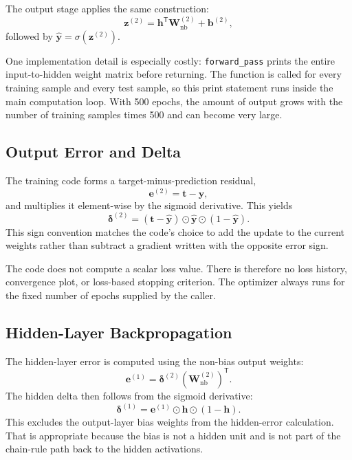 \documentclass[11pt,a4paper]{article}
\newcommand{\code}[1]{\texttt{\small #1}}
\begin{document}
The output stage applies the same construction:
\begin{equation}
\mathbf{z}^{(2)} = \mathbf{h}^{\mathsf T}\mathbf{W}^{(2)}_{\mathrm{nb}} + \mathbf{b}^{(2)},
\end{equation}
followed by \(\hat{\mathbf{y}}=\sigma(\mathbf{z}^{(2)})\).

One implementation detail is especially costly: \code{forward\_pass} prints the entire input-to-hidden weight matrix before returning. The function is called for every training sample and every test sample, so this print statement runs inside the main computation loop. With 500 epochs, the amount of output grows with the number of training samples times 500 and can become very large.

\subsection{Output Error and Delta}
The training code forms a target-minus-prediction residual,
\begin{equation}
\mathbf{e}^{(2)}=\mathbf{t}-\hat{\mathbf{y}},
\end{equation}
and multiplies it element-wise by the sigmoid derivative. This yields
\begin{equation}
\boldsymbol{\delta}^{(2)}
=(\mathbf{t}-\hat{\mathbf{y}})\odot\hat{\mathbf{y}}\odot(1-\hat{\mathbf{y}}).
\end{equation}
This sign convention matches the code's choice to add the update to the current weights rather than subtract a gradient written with the opposite error sign.

The code does not compute a scalar loss value. There is therefore no loss history, convergence plot, or loss-based stopping criterion. The optimizer always runs for the fixed number of epochs supplied by the caller.

\subsection{Hidden-Layer Backpropagation}
The hidden-layer error is computed using the non-bias output weights:
\begin{equation}
\mathbf{e}^{(1)}=\boldsymbol{\delta}^{(2)}(\mathbf{W}^{(2)}_{\mathrm{nb}})^{\mathsf T}.
\end{equation}
The hidden delta then follows from the sigmoid derivative:
\begin{equation}
\boldsymbol{\delta}^{(1)}=\mathbf{e}^{(1)}\odot\mathbf{h}\odot(1-\mathbf{h}).
\end{equation}
This excludes the output-layer bias weights from the hidden-error calculation. That is appropriate because the bias is not a hidden unit and is not part of the chain-rule path back to the hidden activations.
\end{document}
